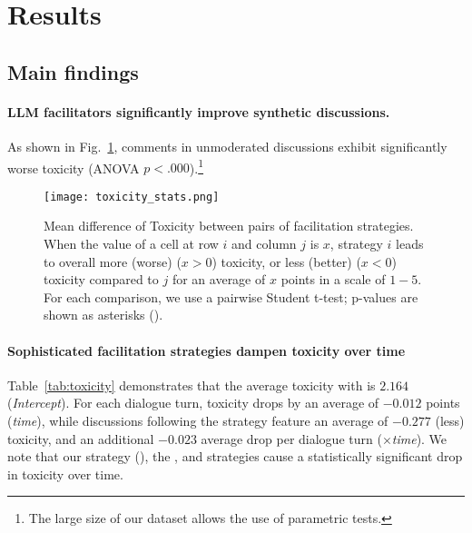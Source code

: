 %

\section{Results}
\label{sec:results}


\subsection{Main findings}

\paragraph{\ac{LLM} facilitators significantly improve synthetic discussions.} As shown in Fig.~\ref{fig:toxicity_stats}, comments in unmoderated discussions exhibit significantly worse toxicity (ANOVA $p<.000$).\footnote{The large size of our dataset allows the use of parametric tests.} 

\begin{figure}
	\texttt{[image: toxicity\_stats.png]}
	\centering
	\caption{Mean difference of Toxicity between pairs of facilitation strategies. When the value of a cell at row $i$ and column $j$ is $x$, strategy $i$ leads to overall more (worse) ($x>0$) toxicity, or less (better) ($x<0$) toxicity compared to $j$ for an average of $x$ points in a scale of $1-5$. For each comparison, we use a pairwise Student t-test; p-values are shown as asterisks (\asterisknote).}
	\label{fig:toxicity_stats}
\end{figure}

\paragraph{Sophisticated facilitation strategies dampen toxicity over time} Table~\ref{tab:toxicity} demonstrates that the average toxicity with \emph{\strategynomod} is $2.164$ (\emph{Intercept}). For each dialogue turn, toxicity drops by an average of $-0.012$ points (\emph{time}), while discussions following the \emph{\strategyregroom} strategy feature an average of  $-0.277$ (less) toxicity, and an additional $-0.023$ average drop per dialogue turn (\emph{\strategyregroom}$\times$\textit{time}). We note that our strategy (\emph{\strategymodgame}), the \emph{\strategyregroom}, and \emph{\strategyconstrcomm} strategies cause a statistically significant drop in toxicity over time.

